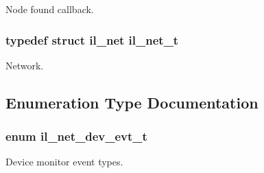 Node found callback. 

\subsubsection[{\texorpdfstring{il\+\_\+net\+\_\+t}{il_net_t}}]{\setlength{\rightskip}{0pt plus 5cm}typedef struct il\+\_\+net {\bf il\+\_\+net\+\_\+t}}\hypertarget{group__IL__NET_ga0657204ab779a5b7a504aa0b895d1ae6}{}\label{group__IL__NET_ga0657204ab779a5b7a504aa0b895d1ae6}


Network. 



\subsection{Enumeration Type Documentation}
\subsubsection[{\texorpdfstring{il\+\_\+net\+\_\+dev\+\_\+evt\+\_\+t}{il_net_dev_evt_t}}]{\setlength{\rightskip}{0pt plus 5cm}enum {\bf il\+\_\+net\+\_\+dev\+\_\+evt\+\_\+t}}\hypertarget{group__IL__NET_ga6e78452befa7532716d8035eb293bc10}{}\label{group__IL__NET_ga6e78452befa7532716d8035eb293bc10}


Device monitor event types. 


